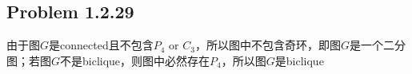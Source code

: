 \subsection*{Problem 1.2.29}
由于图$G$是connected且不包含$P_4$ or $C_3$，所以图中不包含奇环，即图$G$是一个二分图；若图$G$不是biclique，则图中必然存在$P_4$，所以图$G$是biclique

